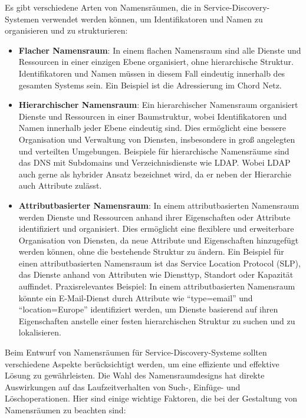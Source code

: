 Es gibt verschiedene Arten von Namensräumen, die in Service-Discovery-Systemen verwendet werden können, um Identifikatoren und Namen zu organisieren und zu strukturieren:
\begin{itemize}
\item \textbf{Flacher Namensraum}: In einem flachen Namensraum sind alle Dienste und Ressourcen in einer einzigen Ebene organisiert, ohne hierarchische Struktur. Identifikatoren und Namen müssen in diesem Fall eindeutig innerhalb des gesamten Systems sein. Ein Beispiel ist die Adressierung im Chord Netz. 
\item \textbf{Hierarchischer Namensraum}: Ein hierarchischer Namensraum organisiert Dienste und Ressourcen in einer Baumstruktur, wobei Identifikatoren und Namen innerhalb jeder Ebene eindeutig sind. Dies ermöglicht eine bessere Organisation und Verwaltung von Diensten, insbesondere in groß angelegten und verteilten Umgebungen. Beispiele für hierarchische Namensräume sind das DNS mit Subdomains und Verzeichnisdienste wie LDAP. Wobei LDAP auch gerne als hybrider Ansatz bezeichnet wird, da er neben der Hierarchie  auch Attribute zulässt. 
\item \textbf{Attributbasierter Namensraum}: In einem attributbasierten Namensraum werden Dienste und Ressourcen anhand ihrer Eigenschaften oder Attribute identifiziert und organisiert. Dies ermöglicht eine flexiblere und erweiterbare Organisation von Diensten, da neue Attribute und Eigenschaften hinzugefügt werden können, ohne die bestehende Struktur zu ändern. Ein Beispiel für einen attributbasierten Namensraum ist das Service Location Protocol (SLP), das Dienste anhand von Attributen wie Diensttyp, Standort oder Kapazität auffindet. Praxisrelevantes Beispiel: In einem attributbasierten Namensraum könnte ein E-Mail-Dienst durch Attribute wie \enquote{type=email} und \enquote{location=Europe} identifiziert werden, um Dienste basierend auf ihren Eigenschaften anstelle einer festen hierarchischen Struktur zu suchen und zu lokalisieren.
\end{itemize}
Beim Entwurf von Namensräumen für Service-Discovery-Systeme sollten verschiedene Aspekte berücksichtigt werden, um eine effiziente und effektive Lösung zu gewährleisten. Die Wahl des Namensraumdesigns hat direkte Auswirkungen auf das Laufzeitverhalten von Such-, Einfüge- und Löschoperationen. Hier sind einige wichtige Faktoren, die bei der Gestaltung von Namensräumen zu beachten sind:
